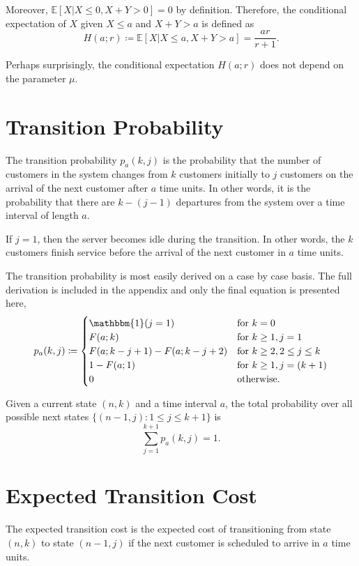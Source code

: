 Moreover, $\mathbb{E} [X | X \leq 0, X + Y > 0] = 0$ by definition. Therefore, the conditional expectation of $X$ given $X \leq a$ and $X + Y > a$ is defined as
\begin{equation}
	H (a; r) \coloneqq \mathbb{E} [X | X \leq a, X + Y > a] = \frac{a r}{r + 1}.
\end{equation}

Perhaps surprisingly, the conditional expectation $H (a; r)$ does not depend on the parameter $\mu$.

\section{Transition Probability}
The transition probability $p_{a} (k, j)$ is the probability that the number of customers in the system changes from $k$ customers initially to $j$ customers on the arrival of the next customer after $a$ time units. In other words, it is the probability that there are $k - (j - 1)$ departures from the system over a time interval of length $a$.

If $j = 1$, then the server becomes idle during the transition. In other words, the $k$ customers finish service before the arrival of the next customer in $a$ time units.

The transition probability is most easily derived on a case by case basis. The full derivation is included in the appendix and only the final equation is presented here,
\begin{equation}
	p_{a} (k, j) \coloneqq \begin{cases}
		\mathbbm{1} (j = 1) & \text{for $k = 0$} \\
		F (a; k) & \text{for $k \geq 1, j = 1$} \\
		F (a; k - j + 1) - F (a; k - j + 2) & \text{for $k \geq 2, 2 \leq j \leq k$} \\
		1 - F (a; 1) & \text{for $k \geq 1, j = (k + 1)$} \\
		0 & \text{otherwise}.
	\end{cases}
\end{equation}

Given a current state $(n, k)$ and a time interval $a$, the total probability over all possible next states $\big\{ (n - 1, j) : 1 \leq j \leq k + 1 \big\}$ is
\begin{equation}
	\sum_{j = 1}^{k + 1} p_{a} (k, j) = 1.
\end{equation}

\section{Expected Transition Cost}
The expected transition cost is the expected cost of transitioning from state $(n, k)$ to state $(n - 1, j)$ if the next customer is scheduled to arrive in $a$ time units.

